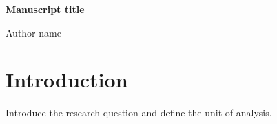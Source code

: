 \documentclass[10pt,letterpaper]{article}
\begin{document}
\begin{center}
  {\bfseries\fontsize{22}{26}\selectfont Manuscript title\par}
  \vspace{7pt}
  {\fontsize{11}{14}\selectfont Author name\par}
\end{center}
\begin{abstract}
State the question, method, result and scope of the evidence.
\end{abstract}
\section{Introduction}
Introduce the research question and define the unit of analysis.
\end{document}
